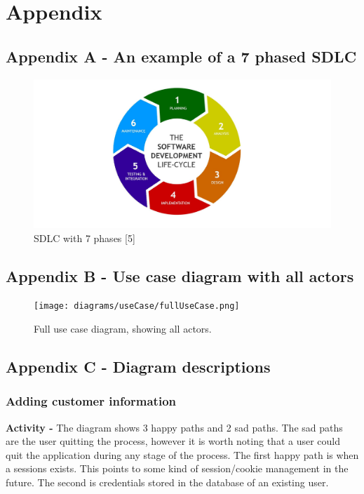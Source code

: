\section{Appendix}

  \label{sec:AppendixA}
  \subsection{Appendix A - An example of a 7 phased SDLC}
    \begin{figure}[H]
      \centering
      \includegraphics[width=12cm]{assets/sdlc7.jpg}
      \caption{SDLC with 7 phases [5]}
      \label{fig:SDLC7}
    \end{figure}
  
  \newpage

  \begin{landscape}
    \label{sec:AppendixB}
    \subsection{Appendix B - Use case diagram with all actors}
      \begin{figure}[H]
        \centering
        \texttt{[image: diagrams/useCase/fullUseCase.png]}
        \caption{Full use case diagram, showing all actors.}
        \label{fig:UCfull}
      \end{figure}
  \end{landscape}
  \newpage

  \subsection{Appendix C - Diagram descriptions}
    \label{sec:AppendixC}

    \subsubsection{Adding customer information}
      \textbf{Activity -} The diagram shows 3 happy paths and 2 sad paths. The sad paths are the user quitting the process, however it is worth
      noting that a user could quit the application during any stage of the process. The first happy path is when a sessions exists.
      This points to some kind of session/cookie management in the future. The second is credentials stored in the database of an 
      existing user.

